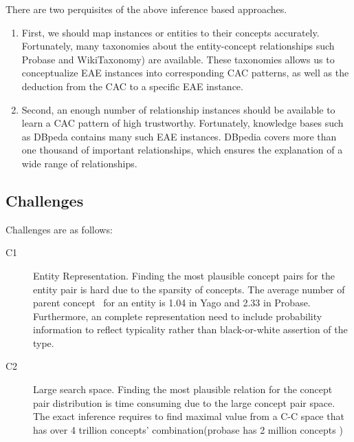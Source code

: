 There are two perquisites of the above inference based approaches.
\begin{enumerate}
\item First, we should map instances or entities to their concepts accurately. Fortunately, many taxonomies about the entity-concept relationships such \ac{Probase} and \ac{WikiTaxonomy}) are available. These taxonomies allows us to conceptualize EAE instances into corresponding CAC patterns, as well as the deduction from the CAC to a specific EAE instance.
\item Second, an enough number of relationship instances should be available to learn a CAC pattern of high trustworthy. Fortunately, knowledge bases such as \ac{DBpeda} contains many such EAE instances. DBpedia covers more than one thousand of important relationships, which ensures the explanation of a wide range of relationships.  
\end{enumerate}


\subsection{Challenges}
Challenges are as follows:
\begin{description}
  \item[C1] Entity Representation.
  Finding the most plausible concept pairs for the entity pair is hard due to the sparsity of concepts.
  The average number of parent concept~\cite{wu2012probase} for an entity is 1.04 in Yago and 2.33 in Probase.
  Furthermore, an complete representation need to include probability information to reflect typicality rather than black-or-white assertion of the type.
  \item[C2] Large search space.
  Finding the most plausible relation for the concept pair distribution is time consuming due to the large concept pair space.
  The exact inference requires to find maximal value from a C-C space that has over 4 trillion concepts' combination(probase has 2 million concepts )
\end{description}



